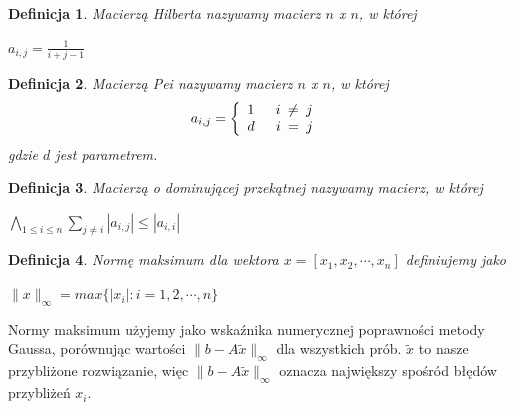 \documentclass[a4paper,10pt]{article}
\newtheorem{definition}{Definicja}
\begin{document}
\begin{definition}
	Macierzą Hilberta nazywamy macierz $n$ x $n$, w której\\
    \begin{center}
    $a_{i,j} = \frac{1}{i+j-1}$
    \end{center}
\end{definition} 

\begin{definition}
	Macierzą Pei nazywamy macierz $n$ x $n$, w której\\
  \[
  a_{i,j} = \left\{
  \begin{array}{l l}
    1 \quad \texttt{ $i$ $\neq$ $j$ }\\
    d \quad \texttt{ $i$ $=$ $j$ }\\
  \end{array} \right.
  \]
    gdzie $d$ jest parametrem.
\end{definition}

\begin{definition}
    Macierzą o dominującej przekątnej nazywamy macierz, w której\\
    \begin{center}
    $\displaystyle \bigwedge_{1 \leq i \leq n } \sum_{ j \neq i } |a_{i,j}| \leq |a_{i,i}| $
    \end{center}
\end{definition}


\begin{definition}
    Normę maksimum dla wektora $x = \left[ x_{1}, x_{2}, \cdots , x_{n} \right] $ definiujemy jako\\
    \begin{center}
        $ \|x\|_{\infty} = max \{|x_{i}| : i = 1, 2, \cdots , n \}$
    \end{center}
\end{definition}

Normy maksimum użyjemy jako wskaźnika numerycznej poprawności metody Gaussa,
porównując wartości $ \| b - A \tilde{x} \|_{\infty}$ dla wszystkich prób.
$\tilde x$ to nasze przybliżone rozwiązanie, więc $\| b - A \tilde{x} \|_{\infty}$ oznacza największy spośród błędów przybliżeń $x_i$.
\end{document}
